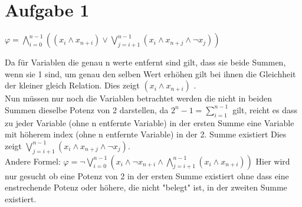 \section*{Aufgabe 1}


$\varphi = \bigwedge_{i=0}^{n-1}((x_i \wedge x_{n+i}) \vee \bigvee_{j=i+1}^{n-1}( x_i \wedge x_{n+j} \wedge \neg x_{j}))$ 



Da für Variablen die genau n werte entfernt sind gilt, dass sie beide Summen, wenn sie 1 sind, um genau den selben Wert erhöhen gilt bei ihnen die Gleichheit der kleiner gleich Relation. Dies zeigt $(x_i \wedge x_{n+i})$ .\\


Nun müssen nur noch die Variablen betrachtet werden die nicht in beiden Summen dieselbe Potenz von 2 darstellen, da $2^n-1 = \sum_{i=1}^{n-1}$ gilt, reicht es dass zu jeder Variable (ohne n entfernte Variable) in der ersten Summe eine Variable mit höherem index (ohne n entfernte Variable) in der 2. Summe  existiert
Dies zeigt $ \bigvee_{j=i+1}^{n-1}( x_i \wedge x_{n+j} \wedge \neg x_{j})$. \\



Andere Formel: $ \varphi = \neg \bigvee_{i=0}^{n-1}(x_i \wedge \neg x_{n+i} \wedge \bigwedge_{j=i+1}^{n-1} (x_i \wedge x_{n+i}))$ 
Hier wird nur gesucht ob eine Potenz von 2 in der ersten Summe existiert ohne dass eine enstrechende Potenz oder höhere, die nicht "belegt" ist, in der zweiten Summe existiert.